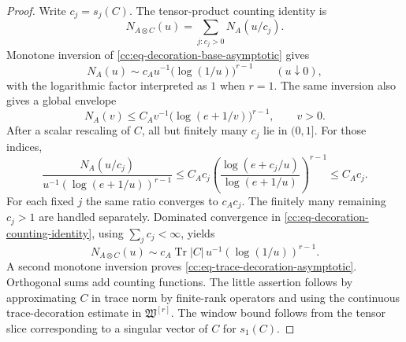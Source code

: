 \documentclass[10pt,reqno]{amsart}
\theoremstyle{plain}
\theoremstyle{definition}
\theoremstyle{remark}
\begin{document}
\begin{proof}
Write $c_j=s_j(C)$.  The tensor-product counting identity is
\begin{equation}
 N_{A\otimes C}(u)=\sum_{j:c_j>0}N_A(u/c_j).
 \label{cc:eq-decoration-counting-identity}
\end{equation}
Monotone inversion of \eqref{cc:eq-decoration-base-asymptotic} gives
\[
 N_A(u)\sim c_Au^{-1}\bigl(\log(1/u)\bigr)^{r-1}
 \qquad (u\downarrow0),
\]
with the logarithmic factor interpreted as $1$ when $r=1$.  The same
inversion also gives a global envelope
\[
 N_A(v)\leq C_Av^{-1}
 \bigl(\log(e+1/v)\bigr)^{r-1},
 \qquad v>0.
\]
After a scalar rescaling of $C$, all but finitely many $c_j$ lie in $(0,1]$.
For those indices,
\[
 \frac{N_A(u/c_j)}
 {u^{-1}(\log(e+1/u))^{r-1}}
 \leq C_Ac_j
 \left(\frac{\log(e+c_j/u)}{\log(e+1/u)}\right)^{r-1}
 \leq C_Ac_j.
\]
For each fixed $j$ the same ratio converges to $c_Ac_j$.  The finitely many
remaining $c_j>1$ are handled separately.  Dominated convergence in
\eqref{cc:eq-decoration-counting-identity}, using $\sum_jc_j<\infty$, yields
\[
 N_{A\otimes C}(u)\sim
 c_A\operatorname{Tr}|C|\,u^{-1}(\log(1/u))^{r-1}.
\]
A second monotone inversion proves
\eqref{cc:eq-trace-decoration-asymptotic}.  Orthogonal sums add counting
functions.  The little assertion follows by approximating $C$ in trace norm
by finite-rank operators and using the continuous trace-decoration estimate in
$\mathfrak W^{[r]}$.  The window bound follows from the tensor slice
corresponding to a singular vector of $C$ for $s_1(C)$.
\end{proof}
\end{document}
